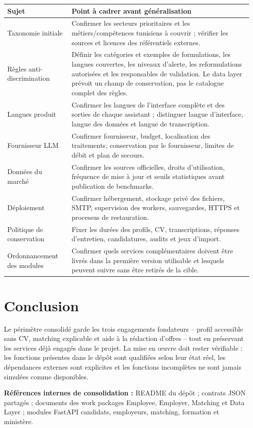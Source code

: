 \documentclass[11pt,a4paper]{article}
\begin{document}
\begin{longtable}{>{\raggedright\arraybackslash}p{} >{\raggedright\arraybackslash}p{}}
\toprule
\textbf{Sujet} & \textbf{Point à cadrer avant généralisation}\\
\midrule
\endhead
Taxonomie initiale & Confirmer les secteurs prioritaires et les métiers/compétences tunisiens à couvrir ; vérifier les sources et licences des référentiels externes.\\
Règles anti-discrimination & Définir les catégories et exemples de formulations, les langues couvertes, les niveaux d'alerte, les reformulations autorisées et les responsables de validation. Le data layer prévoit un champ de conservation, pas le catalogue complet des règles.\\
Langues produit & Confirmer les langues de l'interface complète et des sorties de chaque assistant ; distinguer langue d'interface, langue des données et langue de transcription.\\
Fournisseur LLM & Confirmer fournisseur, budget, localisation des traitements, conservation par le fournisseur, limites de débit et plan de secours.\\
Données du marché & Confirmer les sources officielles, droits d'utilisation, fréquence de mise à jour et seuils statistiques avant publication de benchmarks.\\
Déploiement & Confirmer hébergement, stockage privé des fichiers, SMTP, supervision des workers, sauvegardes, HTTPS et processus de restauration.\\
Politique de conservation & Fixer les durées des profils, CV, transcriptions, réponses d'entretien, candidatures, audits et jeux d'import.\\
Ordonnancement des modules & Confirmer quels services complémentaires doivent être livrés dans la première version utilisable et lesquels peuvent suivre sans être retirés de la cible.\\
\bottomrule
\end{longtable}

\section{Conclusion}

Le périmètre consolidé garde les trois engagements fondateurs -- profil accessible sans CV, matching explicable et aide à la rédaction d'offres -- tout en préservant les services déjà engagés dans le projet. La mise en œuvre doit rester vérifiable : les fonctions présentes dans le dépôt sont qualifiées selon leur état réel, les dépendances externes sont explicites et les fonctions incomplètes ne sont jamais simulées comme disponibles.

\vspace{0.5cm}
\noindent\textbf{Références internes de consolidation :} README du dépôt ; contrats JSON partagés ; documents des work packages Employee, Employer, Matching et Data Layer ; modules FastAPI candidats, employeurs, matching, formation et ministère.
\end{document}
